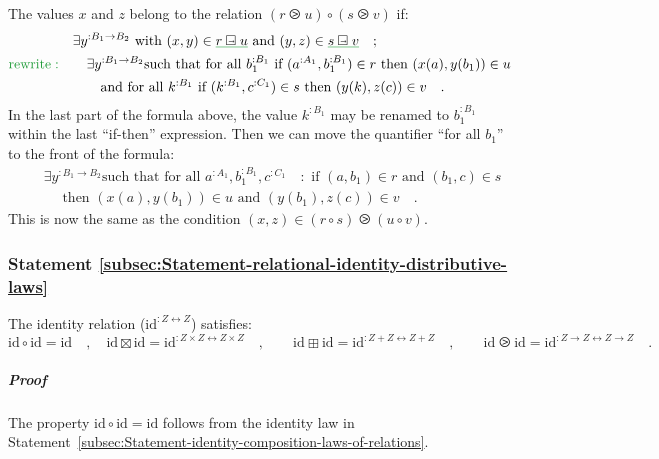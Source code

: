 The values $x$ and $z$ belong to the relation $(r\ogreaterthan u)\circ(s\ogreaterthan v)$
if:
\begin{align*}
 & \exists y^{:B_{1}\rightarrow B_{2}}\text{ with }(x,y)\in\gunderline{r\ogreaterthan u}\text{ and }(y,z)\in\gunderline{s\ogreaterthan v}\quad;\\
{\color{greenunder}\text{rewrite}:}\quad & \quad\exists y^{:B_{1}\rightarrow B_{2}}\text{such that for all }b_{1}^{:B_{1}}\text{ if }(a^{:A_{1}},b_{1}^{:B_{1}})\in r\text{ then }(x(a),y(b_{1}))\in u\\
 & \quad\quad\text{and for all }k^{:B_{1}}\text{ if }(k^{:B_{1}},c^{:C_{1}})\in s\text{ then }(y(k),z(c))\in v\quad.
\end{align*}
In the last part of the formula above, the value $k^{:B_{1}}$ may
be renamed to $b_{1}^{:B_{1}}$ within the last \textsf{``}if-then\textsf{''} expression.
Then we can move the quantifier \textsf{``}for all $b_{1}$\textsf{''} to the front
of the formula:
\begin{align*}
 & \quad\exists y^{:B_{1}\rightarrow B_{2}}\text{such that for all }a^{:A_{1}},b_{1}^{:B_{1}},c^{:C_{1}}\quad:\text{ if }(a,b_{1})\in r\text{ and }(b_{1},c)\in s\\
 & \quad\quad\text{ then }(x(a),y(b_{1}))\in u\text{ and }(y(b_{1}),z(c))\in v\quad.
\end{align*}
This is now the same as the condition $(x,z)\in(r\circ s)\ogreaterthan(u\circ v)$.

\subsubsection{Statement \label{subsec:Statement-relational-identity-distributive-laws}\ref{subsec:Statement-relational-identity-distributive-laws}}

The identity relation ($\text{id}^{:Z\leftrightarrow Z}$) satisfies:
\[
\text{id}\circ\text{id}=\text{id}\quad,\quad\text{id}\boxtimes\text{id}=\text{id}^{:Z\times Z\leftrightarrow Z\times Z}\quad,\quad\quad\text{id}\boxplus\text{id}=\text{id}^{:Z+Z\leftrightarrow Z+Z}\quad,\quad\quad\text{id}\ogreaterthan\text{id}=\text{id}^{:Z\rightarrow Z\leftrightarrow Z\rightarrow Z}\quad.
\]


\subparagraph{Proof}

The property $\text{id}\circ\text{id}=\text{id}$ follows from the
identity law in Statement~\ref{subsec:Statement-identity-composition-laws-of-relations}.

